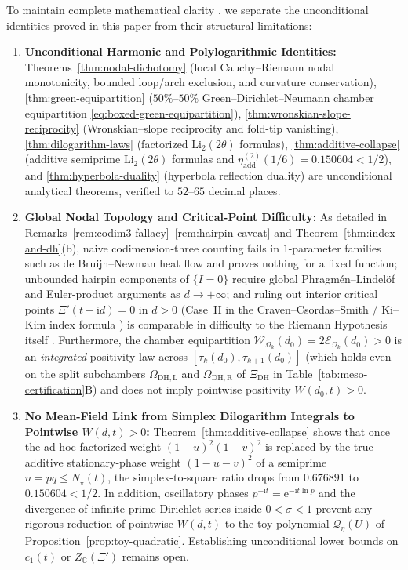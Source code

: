 \documentclass[11pt,reqno]{amsart}
\theoremstyle{definition}
\theoremstyle{remark}
\numberwithin{equation}{section}
\newcommand{\ii}{\mathrm{i}}
\newcommand{\ee}{\mathrm{e}}
\newcommand{\Li}{\mathrm{Li}}
\newcommand{\DHf}{\mathrm{DH}}
\newcommand{\addw}{\mathrm{add}}
\begin{document}
To maintain complete mathematical clarity \cite{Bombieri2000,Edwards1974,Titchmarsh1986}, we separate the unconditional identities proved in this paper from their structural limitations:
\begin{enumerate}[label=\upshape(\arabic*),leftmargin=2.2em]
\item \textbf{Unconditional Harmonic and Polylogarithmic Identities:} Theorems~\ref{thm:nodal-dichotomy} (local Cauchy--Riemann nodal monotonicity, bounded loop/arch exclusion, and curvature conservation), \ref{thm:green-equipartition} ($50\%$--$50\%$ Green--Dirichlet--Neumann chamber equipartition \eqref{eq:boxed-green-equipartition}), \ref{thm:wronskian-slope-reciprocity} (Wronskian--slope reciprocity and fold-tip vanishing), \ref{thm:dilogarithm-laws} (factorized $\Li_2(2\theta)$ formulas), \ref{thm:additive-collapse} (additive semiprime $\Li_2(2\theta)$ formulas and $\eta_{\addw}^{(2)}(1/6)=0.150604<1/2$), and \ref{thm:hyperbola-duality} (hyperbola reflection duality) are unconditional analytical theorems, verified to $52$--$65$ decimal places.
\item \textbf{Global Nodal Topology and Critical-Point Difficulty:} As detailed in Remarks~\ref{rem:codim3-fallacy}--\ref{rem:hairpin-caveat} and Theorem~\ref{thm:index-and-dh}(b), naive codimension-three counting fails in $1$-parameter families such as de Bruijn--Newman heat flow and proves nothing for a fixed function; unbounded hairpin components of $\{I=0\}$ require global Phragm\'{e}n--Lindel\"{o}f and Euler-product arguments as $d \to +\infty$; and ruling out interior critical points $\Xi'(t-\ii d)=0$ in $d>0$ (Case~II in the Craven--Csordas--Smith / Ki--Kim index formula \cite{CravenCsordasSmith1987,KiKim2000}) is comparable in difficulty to the Riemann Hypothesis itself \cite{Speiser1934}. Furthermore, the chamber equipartition $\mathcal{W}_{\Omega_k}(d_0) = 2\mathcal{E}_{\Omega_k}(d_0) > 0$ is an \emph{integrated} positivity law across $[\tau_k(d_0),\tau_{k+1}(d_0)]$ (which holds even on the split subchambers $\Omega_{\DHf,\mathrm{L}}$ and $\Omega_{\DHf,\mathrm{R}}$ of $\Xi_{\DHf}$ in Table~\ref{tab:meso-certification}B) and does not imply pointwise positivity $W(d_0,t) > 0$.
\item \textbf{No Mean-Field Link from Simplex Dilogarithm Integrals to Pointwise $W(d,t) > 0$:} Theorem~\ref{thm:additive-collapse} shows that once the ad-hoc factorized weight $(1-u)^2(1-v)^2$ is replaced by the true additive stationary-phase weight $(1-u-v)^2$ of a semiprime $n = pq \le N_\star(t)$, the simplex-to-square ratio drops from $0.676891$ to $0.150604 < 1/2$. In addition, oscillatory phases $p^{-\ii t} = \ee^{-\ii t\ln p}$ and the divergence of infinite prime Dirichlet series inside $0 < \sigma < 1$ prevent any rigorous reduction of pointwise $W(d,t)$ to the toy polynomial $\mathcal{Q}_\eta(U)$ of Proposition~\ref{prop:toy-quadratic}. Establishing unconditional lower bounds on $c_1(t)$ or $Z_{\mathbb{C}}(\Xi')$ remains open.
\end{enumerate}
\end{document}
